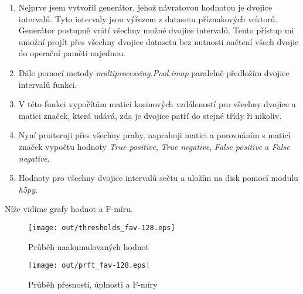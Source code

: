 \documentclass[11pt]{article}
\begin{document}
    \begin{enumerate}
        \item Nejprve jsem vytvořil generátor, jehož návratovou hodnotou je dvojice intervalů.
        Tyto intervaly jsou výřezem z datasetu příznakových vektorů.
        Generátor postupně vrátí všechny možné dvojice intervalů.
        Tento přístup mi umožní projít přes všechny dvojice datasetu bez nutnosti načtení všech dvojic do operační
        paměti najednou.
        \item Dále pomocí metody \textit{multiprocessing.Pool.imap} paralelně předložím dvojice intervalů funkci.
        \item V této funkci vypočítám matici kosinových vzdáleností pro všechny dvojice a matici značek, která udává,
        zda je dvojice patří do stejné třídy ři nikoliv.
        \item Nyní proiteruji přes všechny prahy, naprahuji matici a porovnáním s maticí značek vypočtu hodnoty
        \textit{True positive}, \textit{True negative}, \textit{False positive} a \textit{False negative}.
        \item Hodnoty pro všechny dvojice intervalů sečtu a uložím na disk pomocí modulu \textit{h5py}.
    \end{enumerate}

    Níže vidíme grafy hodnot a F-míru.

    \begin{figure}[H]
        \centering
        \texttt{[image: out/thresholds\_fav-128.eps]}
        \caption{Průběh naakumulovaných hodnot}
        \label{fig:thresh}
    \end{figure}

    \newpage

    \begin{figure}[H]
        \centering
        \texttt{[image: out/prft\_fav-128.eps]}
        \caption{Průběh přesnosti, úplnosti a F-míry}
        \label{fig:prft}
    \end{figure}
\end{document}
